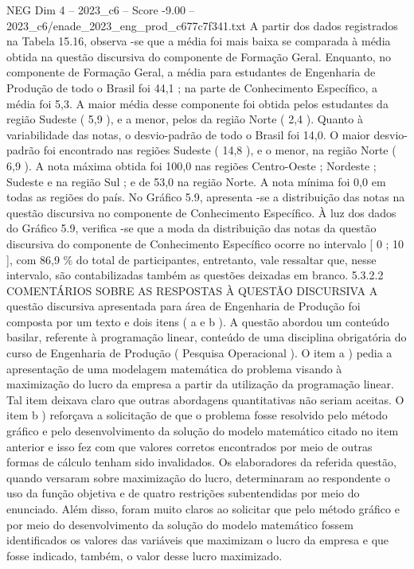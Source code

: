 \begin{textsample}{NEG Dim 4 – 2023\_c6 – Score -9.00 – 2023\_c6/enade\_2023\_eng\_prod\_c677c7f341.txt}
A partir dos dados registrados na Tabela 15.16, observa -se que a média foi mais baixa se comparada à média obtida na questão discursiva do componente de Formação Geral.
Enquanto, no componente de Formação Geral, a média para estudantes de Engenharia de Produção de todo o Brasil foi 44,1 ; na parte de Conhecimento Específico, a média foi 5,3.
A maior média desse componente foi obtida pelos estudantes da região Sudeste ( 5,9 ), e a menor, pelos da região Norte ( 2,4 ).
Quanto à variabilidade das notas, o desvio-padrão de todo o Brasil foi 14,0.
O maior desvio-padrão foi encontrado nas regiões Sudeste ( 14,8 ), e o menor, na região Norte ( 6,9 ).
A nota máxima obtida foi 100,0 nas regiões Centro-Oeste ; Nordeste ; Sudeste e na região Sul ; e de 53,0 na região Norte.
A nota mínima foi 0,0 em todas as regiões do país.
No Gráfico 5.9, apresenta -se a distribuição das notas na questão discursiva no componente de Conhecimento Específico.
À luz dos dados do Gráfico 5.9, verifica -se que a moda da distribuição das notas da questão discursiva do componente de Conhecimento Específico ocorre no intervalo [ 0 ; 10 ], com 86,9 \% do total de participantes, entretanto, vale ressaltar que, nesse intervalo, são contabilizadas também as questões deixadas em branco. 5.3.2.2 COMENTÁRIOS SOBRE AS RESPOSTAS À QUESTÃO DISCURSIVA A questão discursiva apresentada para área de Engenharia de Produção foi composta por um texto e dois itens ( a e b ).
A questão abordou um conteúdo basilar, referente à programação linear, conteúdo de uma disciplina obrigatória do curso de Engenharia de Produção ( Pesquisa Operacional ).
O item a ) pedia a apresentação de uma modelagem matemática do problema visando à maximização do lucro da empresa a partir da utilização da programação linear.
Tal item deixava claro que outras abordagens quantitativas não seriam aceitas.
O item b ) reforçava a solicitação de que o problema fosse resolvido pelo método gráfico e pelo desenvolvimento da solução do modelo matemático citado no item anterior e isso fez com que valores corretos encontrados por meio de outras formas de cálculo tenham sido invalidados.
Os elaboradores da referida questão, quando versaram sobre maximização do lucro, determinaram ao respondente o uso da função objetiva e de quatro restrições subentendidas por meio do enunciado.
Além disso, foram muito claros ao solicitar que pelo método gráfico e por meio do desenvolvimento da solução do modelo matemático fossem identificados os valores das variáveis que maximizam o lucro da empresa e que fosse indicado, também, o valor desse lucro maximizado.

\end{textsample}
